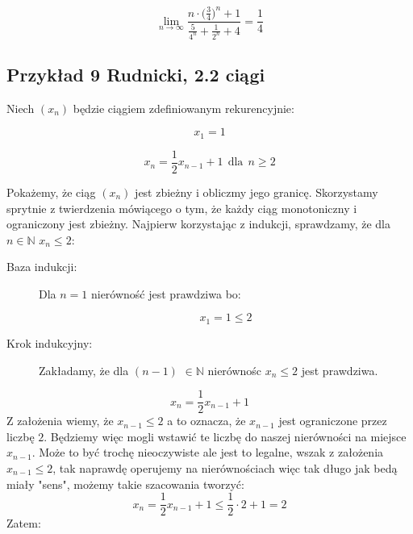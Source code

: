 \documentclass[a4paper,oneside,openright,11pt]{article}
\numberwithin{equation}{section}
\begin{document}
\begin{equation*}
    \lim_{n\to\infty} \frac{n \cdot \Big(\frac{3}{4} \Big)^{n} + 1}{\frac{5}{4^n} + \frac{1}{2^n} + 4} = \frac{1}{4}
\end{equation*}


\subsection{Przykład 9 Rudnicki, 2.2 ciągi}

Niech $(x_n)$ będzie ciągiem zdefiniowanym rekurencyjnie:

\begin{equation*}
    x_{1} = 1
\end{equation*}

\begin{equation*}
    x_{n} = \frac{1}{2} x_{n - 1} + 1 \ \ \mbox{dla} \ \  n \geq 2
\end{equation*}

Pokażemy, że ciąg $(x_n)$ jest zbieżny i obliczmy jego granicę. Skorzystamy sprytnie z twierdzenia
mówiącego o tym, że każdy ciąg monotoniczny i ograniczony jest zbieżny. Najpierw korzystając z indukcji, sprawdzamy, że dla $n \in \mathbb{N}$ $x_{n} \leq 2$:

\begin{description}

    \item[Baza indukcji:] Dla $n=1$ nierówność jest prawdziwa bo:
    
    \begin{equation*}
        x_1 = 1 \leq 2
    \end{equation*}
    
    \item[Krok indukcyjny:] Zakładamy, że dla $(n-1)$ $\in \mathbb{N}$ nierównośc $x_{n} \leq 2$ jest prawdziwa.
\end{description}


    \begin{equation*}
        x_n = \frac{1}{2} x_{n-1} + 1
    \end{equation*}
    Z założenia wiemy, że $x_{n-1} \leq 2$ a to oznacza, że $x_{n-1}$ jest ograniczone przez liczbę $2$. Będziemy więc mogli wstawić 
    te liczbę do naszej nierówności na miejsce $x_{n-1}$. Może to być trochę nieoczywiste ale jest to legalne, wszak z założenia $x_{n-1} \leq 2$, tak naprawdę operujemy
    na nierównościach więc tak długo jak bedą miały "sens", możemy takie szacowania tworzyć:
    \begin{equation*}
        x_n = \frac{1}{2}x_{n-1} + 1 \leq \frac{1}{2} \cdot 2 + 1 = 2
    \end{equation*}
    Zatem:
\end{document}
